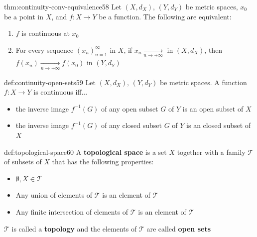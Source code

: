 \documentclass[landscape, 8pt]{extarticle}
\begin{document}
\begin{multicols}{3}
\vspace{-5pt}
\begin{thm}{thm:continuity-conv-equivalence}{58}
    \vspace{-5pt}
    Let $(X, d_{X}),\, (Y, d_{Y})$ be metric spaces, $x_{0}$ be a point in $X$, and $f : X \to Y$ be a function. The following are equivalent:
    \vspace{-5pt}
    \begin{enumerate}
        \item $f$ is continuous at $x_{0}$
        \item For every sequence $(x_{n})^{\infty}_{n = 1}$ in $X$, if $x_{n}\xrightarrow[n\to +\infty]{}$ in $(X, d_{X})$, then $f(x_{n}) \xrightarrow[n\to +\infty]{} f(x_{0})$ in $(Y, d_{Y})$
    \end{enumerate}
\end{thm}

\begin{thm}{def:continuity-open-sets}{59}
    \vspace{-5pt}
    Let $(X, d_{X}),\,(Y, d_{Y})$ be metric spaces. A function $f: X \to Y $ is continuous iff...

    \vspace{-5pt}
    \begin{itemize}[leftmargin=*]
        \item the inverse image $f^{-1}(G)$ of any open subset $G$ of $Y$ is an open subset of $X$
        \item the inverse image $f^{-1}(G)$ of any closed subset $G$ of $Y$ is an closed subset of $X$

    \end{itemize}
\vspace{-5pt}

\end{thm}

\begin{dfn}{def:topological-space}{60}
    \vspace{-5pt}
    A \textbf{topological space} is a set $X$ together with a family $\mathcal{T}$ of subsets of $X$ that has the following properties:
    \vspace{-5pt}
    \begin{itemize}
        \item $\emptyset,X\in \mathcal{T}$
        \item Any union of elements of $\mathcal{T}$ is an element of $\mathcal{T}$
        \item Any finite intersection of elements of $\mathcal{T}$ is an element of $\mathcal{T}$
    \end{itemize}
    \vspace{-5pt}
    $\mathcal{T}$ is called a \textbf{topology} and the elements of $\mathcal{T}$ are called \textbf{open sets}
\end{dfn}


\end{multicols}
\end{document}
